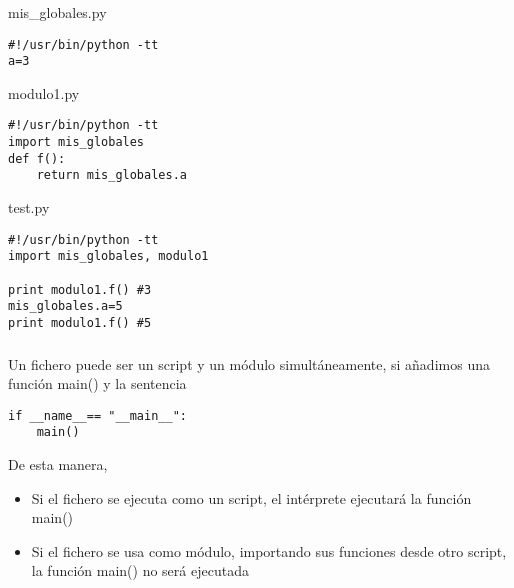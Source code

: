 \documentclass[ucs]{beamer}
\begin{document}
\begin{frame}[fragile]
\frametitle{}

  \begin{footnotesize}
  \begin{center}
mis\_globales.py
  \end{center}
  \begin{verbatim}
#!/usr/bin/python -tt
a=3
  \end{verbatim}
  \end{footnotesize}


  \begin{footnotesize}
  \begin{center}
modulo1.py
  \end{center}
  \begin{verbatim}
#!/usr/bin/python -tt
import mis_globales
def f():
    return mis_globales.a
  \end{verbatim}
  \end{footnotesize}

  \begin{footnotesize}
  \begin{center}
test.py
  \end{center}
  \begin{verbatim}
#!/usr/bin/python -tt
import mis_globales, modulo1

print modulo1.f() #3
mis_globales.a=5
print modulo1.f() #5
  \end{verbatim}
  \end{footnotesize}

\end{frame}



\begin{frame}[fragile]
\frametitle{}
Un fichero puede ser un script y un módulo simultáneamente, si añadimos una función
main() y la sentencia

  \begin{footnotesize}
  \begin{verbatim}
if __name__== "__main__":
    main()
  \end{verbatim}
  \end{footnotesize}

De esta manera,

\begin{itemize}
\item
    Si el fichero se ejecuta como un script, el intérprete ejecutará la función main()
\item
    Si el fichero se usa como módulo, importando sus funciones desde otro script,
la función main() no será ejecutada
\end{itemize}


\end{frame}
\end{document}
